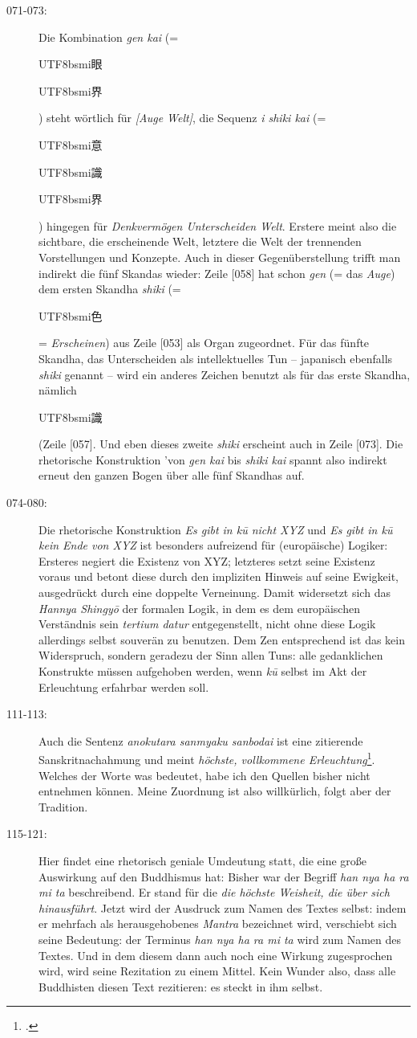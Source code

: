 \documentclass[
DIV=calc,
BCOR=5mm,
11pt,
headings=small,
oneside,
bibtotocnumbered]{scrartcl}
\newcommand{\cnbsmi}[1]{\begin{CJK}{UTF8}{bsmi}#1\end{CJK}}
\begin{document}
\begin{description}
  \item[071-073:] Die Kombination \emph{gen kai} (= \cnbsmi{眼} \cnbsmi{界}) steht
  wörtlich für \emph{[Auge Welt]}, die Sequenz \emph{i shiki kai} (= \cnbsmi{意}
  \cnbsmi{識} \cnbsmi{界}) hingegen für \emph{Denkvermögen Unterscheiden Welt}.
  Erstere meint also die sichtbare, die erscheinende Welt, letztere die Welt der
  trennenden Vorstellungen und Konzepte. Auch in dieser Gegenüberstellung trifft
  man indirekt die fünf Skandas wieder: Zeile [058] hat schon \emph{gen} (= das
  \emph{Auge}) dem ersten Skandha \emph{shiki} (= \cnbsmi{色} =
  \emph{Erscheinen}) aus Zeile [053] als Organ zugeordnet. Für das fünfte
  Skandha, das Unterscheiden als intellektuelles Tun -- japanisch ebenfalls
  \emph{shiki} genannt -- wird ein anderes Zeichen benutzt als für das erste
  Skandha, nämlich \cnbsmi{識} (Zeile [057]. Und eben dieses zweite \emph{shiki}
  erscheint auch in Zeile [073]. Die rhetorische Konstruktion 'von \emph{gen
  kai} bis \emph{shiki kai} spannt also indirekt erneut den ganzen Bogen über
  alle fünf Skandhas auf.

  \item[074-080:] Die rhetorische Konstruktion \emph{Es gibt in kū nicht XYZ}
  und \emph{Es gibt in kū kein Ende von XYZ} ist besonders aufreizend für
  (europäische) Logiker: Ersteres negiert die Existenz von XYZ; letzteres setzt
  seine Existenz voraus und betont diese durch den impliziten Hinweis auf seine
  Ewigkeit, ausgedrückt durch eine doppelte Verneinung. Damit widersetzt sich
  das \emph{Hannya Shingyō} der formalen Logik, in dem es dem europäischen
  Verständnis sein \emph{tertium datur} entgegenstellt, nicht ohne diese Logik
  allerdings selbst souverän zu benutzen. Dem Zen entsprechend ist das kein
  Widerspruch, sondern geradezu der Sinn allen Tuns: alle gedanklichen
  Konstrukte müssen aufgehoben werden, wenn \emph{kū} selbst im  Akt der
  Erleuchtung erfahrbar werden soll.

  \item[111-113:] Auch die Sentenz \emph{anokutara sanmyaku sanbodai} ist eine
  zitierende Sanskritnachahmung und meint \emph{höchste, vollkommene
  Erleuchtung}\footcite[vgl.][\nopage Anm. 10]{Scheid2016a}. Welches der Worte
  was bedeutet, habe ich den Quellen bisher nicht entnehmen können. Meine
  Zuordnung ist also willkürlich, folgt aber der Tradition.

  \item[115-121:] Hier findet eine rhetorisch geniale Umdeutung statt, die eine
  große Auswirkung auf den Buddhismus hat: Bisher war der Begriff \emph{han nya
  ha ra mi ta} beschreibend. Er stand für die \emph{die höchste Weisheit, die
  über sich hinausführt}. Jetzt wird der Ausdruck zum Namen des Textes selbst:
  indem er mehrfach als herausgehobenes \emph{Mantra} bezeichnet wird,
  verschiebt sich seine Bedeutung: der Terminus \emph{han nya ha ra mi ta} wird
  zum Namen des Textes. Und in dem diesem dann auch noch eine Wirkung
  zugesprochen wird, wird seine Rezitation zu einem Mittel. Kein Wunder also,
  dass alle Buddhisten diesen Text rezitieren: es steckt in ihm selbst.
 

\end{description}
\end{document}
